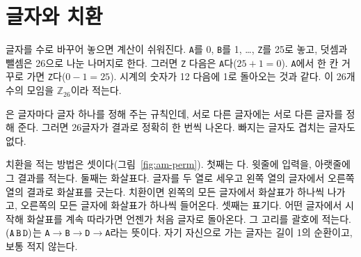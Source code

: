 \section{글자와 치환}\label{sec:am-perm}

글자를 수로 바꾸어 놓으면 계산이 쉬워진다. \texttt{A}를 0, \texttt{B}를 1, \ldots, \texttt{Z}를 25로 놓고,
덧셈과 뺄셈은 26으로 나눈 나머지로 한다. 그러면 \texttt{Z} 다음은 \texttt{A}다($25+1 = 0$). \texttt{A}에서 한 칸
거꾸로 가면 \texttt{Z}다($0-1 = 25$). 시계의 숫자가 12 다음에 1로 돌아오는 것과 같다. 이 26개 수의 모임을
$\mathbb{Z}_{26}$이라 적는다.

은 글자마다 글자 하나를 정해 주는 규칙인데, 서로 다른 글자에는 서로 다른 글자를 정해
준다. 그러면 26글자가 결과로 정확히 한 번씩 나온다. 빠지는 글자도 겹치는 글자도 없다.

치환을 적는 방법은 셋이다(그림~\ref{fig:am-perm}). 첫째는 다. 윗줄에 입력을,
아랫줄에 그 결과를 적는다. 둘째는 화살표다. 글자를 두 열로 세우고 왼쪽 열의 글자에서 오른쪽 열의 결과로 화살표를
긋는다. 치환이면 왼쪽의 모든 글자에서 화살표가 하나씩 나가고, 오른쪽의 모든 글자에 화살표가 하나씩 들어온다.
셋째는  표기다. 어떤 글자에서 시작해 화살표를 계속 따라가면 언젠가 처음 글자로 돌아온다. 그
고리를 괄호에 적는다. $(\mathtt{A\,B\,D})$는 \texttt{A}$\to$\texttt{B}$\to$\texttt{D}$\to$\texttt{A}라는 뜻이다. 자기
자신으로 가는 글자는 길이 1의 순환이고, 보통 적지 않는다.

